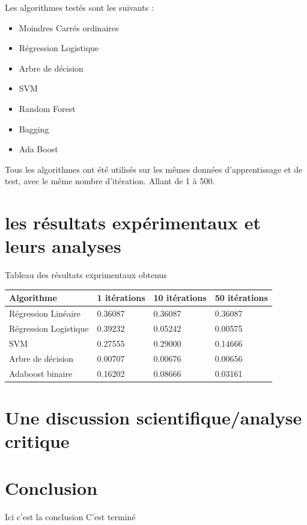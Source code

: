 \documentclass{article}
\begin{document}
Les algorithmes testés sont les suivants :
\begin{itemize}
    \item Moindres Carrés ordinaires 
    \item Régression Logistique
    \item Arbre de décision
    \item SVM
    \item Random Forest
    \item Bagging
    \item Ada Boost
\end{itemize}

Tous les algorithmes ont été utilisés sur les mêmes données d'apprentissage et de test, avec le même nombre d'itération. Allant de 1 à 500.





\section{les résultats expérimentaux et leurs analyses}
Tableau des résultats exprimentaux obtenus

\begin{center}
    \begin{tabular}{| l | l | l | l |}
    \hline
    Algorithme & 1 itérations & 10 itérations & 50 itérations \\ \hline
    Régression Linéaire & 0.36087 &  0.36087 &  0.36087 
    \\ \hline
    Régression Logistique & 0.39232 & 0.05242 & 0.00575  \\ \hline
    SVM & 0.27555 & 0.29000 & 0.14666  \\ \hline
    Arbre de décision & 0.00707 & 0.00676 & 0.00656 \\ \hline
    Adaboost binaire & 0.16202 & 0.08666 & 0.03161 \\
    \hline
    \end{tabular}
\end{center}


\section{Une discussion scientifique/analyse critique}

\section{Conclusion}
Ici c'est la conclusion 
C'est terminé



\end{document}
